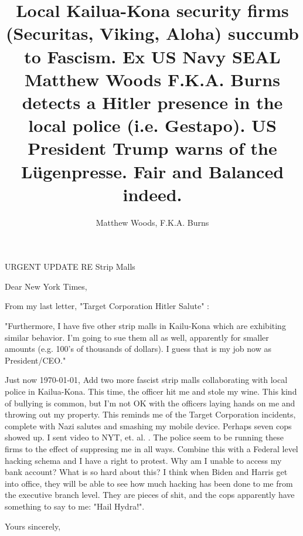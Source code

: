\documentclass[a4paper]{arthur-letter}
\title{Local Kailua-Kona security firms (Securitas, Viking, Aloha) succumb to Fascism. Ex US Navy SEAL Matthew Woods F.K.A. Burns detects a Hitler presence in the local police (i.e. Gestapo). US President Trump warns of the Lügenpresse. Fair and Balanced indeed.}
\author{Matthew Woods, F.K.A. Burns}
\begin{document}
    \makeprofile %
    
    \address{Matthew Woods,\\PO Box 376\\Mountain View, CA, 94042}

    \begin{letter}

            \subject{TLDR: I'm a former Navy SEAL, smeared by Dianna Cowern (AKA Physics Girl) via Alphabet Inc while working as a Google employee. From 2015-2020, I have experienced severe police misconduct first hand. This is across five counties: San Diego, Orange, Santa Clara, Oahu and Hawaii. I think they may have ties to THE Nazis, since my entire immediate family (Donald Burns, Anne Burns and Susan Burns) are Nazis... the type that agree with Adolf Hitler and Eichmann of WWII. They lied to me about this since I was born. Target Corporation, local strip malls and police succumb to fascism and try to suppress me in all ways.}
            
            URGENT UPDATE RE Strip Malls
            
            \opening{Dear New York Times,}
            
            From my last letter, "Target Corporation Hitler Salute" \cite{targetcorporationhitlersalute}:
            
            "Furthermore, I have five other strip malls in Kailu-Kona which are exhibiting similar behavior. I'm going to sue them all as well, apparently for smaller amounts (e.g. 100's of thousands of dollars). I guess that is my job now as President/CEO."
            
            Just now \today, 
            Add two more fascist strip malls collaborating with local police in Kailua-Kona. This time, the officer hit me and stole my wine. This kind of bullying is common, but I'm not OK with the officers laying hands on me and throwing out my property. This reminds me of the Target Corporation incidents, complete with Nazi salutes and smashing my mobile device. Perhaps seven cops showed up. I sent video to NYT, et. al.
            \cite{alphabetinc} \cite{bigbangtheoryhouse5058pendleton}. 
            The police seem to be running these firms to the effect of suppresing me in all ways. Combine this with a Federal level hacking schema and I have a right to protest. Why am I unable to access my bank account? What is so hard about this? I think when Biden and Harris get into office, they will be able to see how much hacking has been done to me from the executive branch level. They are pieces of shit, and the cops apparently have something to say to me: "Hail Hydra!". 
            
            \closing{Yours sincerely,} %


    \end{letter}
\end{document}

